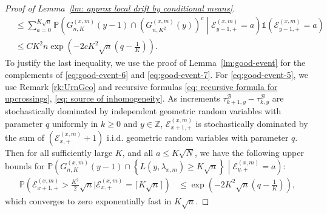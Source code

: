 \documentclass[EJP]{ejpecp} %
\begin{document}
\begin{proof}[Proof of Lemma~\ref{lm: approx local drift by conditional means}]
\begin{align*}
		&\le \sum_{a = 0}^{K \sqrt{n}} \mathbb{P}\left(  G_{n, K}^{(x,m)}(y-1)\cap\left( G_{n, K^2}^{(x,m)}(y) \right) ^c \middle| \mathcal{E}_{y-1, +}^{(x,m)} = a \right) \mathbb{1}\left( \mathcal{E}_{y-1, +}^{(x,m)} = a \right) \\
		&\le C K^2 n \exp\left( - 2 c K^2 \sqrt{n} (q - \frac{1}{K}) \right)
		.
	\end{align*}
	To justify the last inequality,
	we use the proof of Lemma~\ref{lm:good-event} for the complements of \eqref{eq:good-event-6} and \eqref{eq:good-event-7}. For \eqref{eq:good-event-5},
	we use Remark \ref{rk:UrnGeo} and recursive formulas \eqref{eq: recursive formula for upcrossings}, \eqref{eq: source of inhomogeneity}. As increments $\tau^{\mathscr{B}}_{k+1,y} -\tau^{\mathscr{B}}_{k,y}$ are stochastically dominated by independent geometric random variables with parameter $q$ uniformly in $ k \geq 0$ and $y \in \mathbb{Z}$, $\mathcal{E}_{x+1,+}^{(x,m)}$ is stochastically dominated by the sum of $ (\mathcal{E}_{x,+}^{(x,m)} +1) $ i.i.d. geometric random variables with parameter $q$. Then for all sufficiently large $K$, and all $a\leq K\sqrt{N}$, we have the following upper bounds for $\mathbb{P}\left( G_{n, K}^{(x,m)}(y-1)\cap \left\{L(y, \lambda_{x, m}) \ge K \sqrt{n}\right\} \middle| \mathcal{E}_{y, +}^{(x,m)}=a \right)$:
	\begin{align*}
		\mathbb{P}\left(\mathcal{E}_{x+1,+}^{(x,m)} > \frac{K^2}{2} \sqrt{n} | \mathcal{E}_{x,+}^{(x, m)} = \lceil K \sqrt{n} \rceil\right)
		&\le \exp\left( - 2 K^2 \sqrt{n}(q - \frac{1}{K})  \right) 
		,
	\end{align*}
	which converges to zero exponentially fast in $K \sqrt{n}$. 
	

\end{proof}
\end{document}
